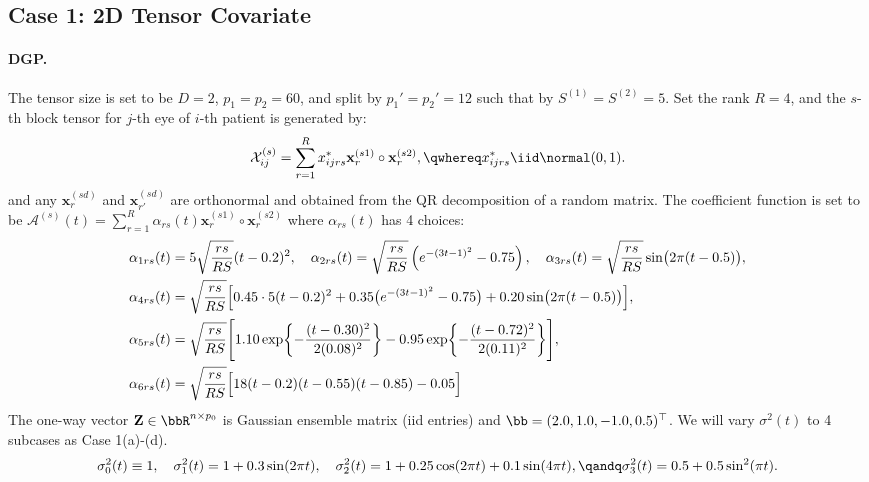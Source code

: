 \documentclass[10pt]{notes}
\begin{document}
\subsection*{Case 1: 2D Tensor Covariate}
\paragraph*{DGP.}
The tensor size is set to be $D=2$, $p_1=p_2=60$, and split by $p_1'=p_2'=12$ such that by $S^{(1)}=S^{(2)}=5$. Set the rank $R=4$, and the $s$-th block tensor for $j$-th eye of $i$-th patient is generated by:
\begin{align*}
    \mathcal{X}_{ij}^{(s)}=\sum_{r=1}^{R}x^*_{ijrs}\mathbf{x}_{r}^{(s1)}\circ\mathbf{x}_{r}^{(s2)},
    \qwhereq
    x_{ijrs}^*\iid \normal(0,1).
\end{align*}
and any $\mathbf{x}_{r}^{(sd)}$ and $\mathbf{x}_{r'}^{(sd)}$ are orthonormal and obtained from the QR decomposition of a random matrix. The coefficient function is set to be $\mathcal{A}^{(s)}(t)=\sum_{r=1}^{R} \alpha_{rs}(t)\mathbf{x}_r^{(s1)}\circ \mathbf{x}_r^{(s2)}$ where $\alpha_{rs}(t)$ has 4 choices:
\begin{align*}
    &\alpha_{1rs}(t)=
    5\sqrt{\frac{rs}{RS}}(t-0.2)^2,\quad
    \alpha_{2rs}(t)=
    \sqrt{\frac{rs}{RS}}
    \left(e^{-(3t-1)^2}-0.75\right),\quad
    \alpha_{3rs}(t)=
    \sqrt{\frac{rs}{RS}}\sin\bigl(2\pi(t-0.5)\bigr),\\
    &\alpha_{4rs}(t)=
    \sqrt{\frac{rs}{RS}}
    \Bigl[
    0.45\cdot 5(t-0.2)^2
    +0.35\bigl(e^{-(3t-1)^2}-0.75\bigr)
    +0.20\sin\bigl(2\pi(t-0.5)\bigr)
    \Bigr],\\
    &\alpha_{5rs}(t)=
    \sqrt{\frac{rs}{RS}}
    \Biggl[
    1.10\exp\!\left\{-\frac{(t-0.30)^2}{2(0.08)^2}\right\}
    -0.95\exp\!\left\{-\frac{(t-0.72)^2}{2(0.11)^2}\right\}
    \Biggr],\\
    &\alpha_{6rs}(t)=
    \sqrt{\frac{rs}{RS}}
    \Bigl[
    18(t-0.2)(t-0.55)(t-0.85)-0.05
    \Bigr]
\end{align*}
The one-way vector $\mathbf{Z}\in\bbR^{n\times p_0}$ is Gaussian ensemble matrix (iid entries) and $\bb=(2.0,1.0,-1.0,0.5)^\top$. We will vary $\sigma^2(t)$ to 4 subcases as Case 1(a)-(d).
\begin{align}
    \sigma^2_0(t)\equiv 1,\quad
    \sigma^2_1(t)=1+0.3\sin(2\pi t),\quad
    \sigma^2_2(t)=1+0.25\cos(2\pi t)+0.1 \sin(4\pi t),\qandq
    \sigma^2_3(t)=0.5+0.5\sin^2(\pi t).
\end{align}
\end{document}
